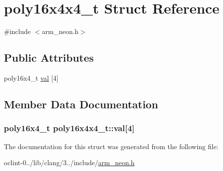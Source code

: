 \hypertarget{structpoly16x4x4__t}{\section{poly16x4x4\-\_\-t Struct Reference}
\label{structpoly16x4x4__t}
}


{\ttfamily \#include $<$arm\-\_\-neon.\-h$>$}

\subsection*{Public Attributes}
\begin{DoxyCompactItemize}
\item 
poly16x4\-\_\-t \hyperlink{structpoly16x4x4__t_a7380b4f99a00dc7754d121da527832ad}{val} \mbox{[}4\mbox{]}
\end{DoxyCompactItemize}


\subsection{Member Data Documentation}
\hypertarget{structpoly16x4x4__t_a7380b4f99a00dc7754d121da527832ad}{
\subsubsection[{val}]{\setlength{\rightskip}{0pt plus 5cm}poly16x4\-\_\-t poly16x4x4\-\_\-t\-::val\mbox{[}4\mbox{]}}}\label{structpoly16x4x4__t_a7380b4f99a00dc7754d121da527832ad}


The documentation for this struct was generated from the following file\-:\begin{DoxyCompactItemize}
\item 
oclint-\/0../lib/clang/3../include/\hyperlink{arm__neon_8h}{arm\-\_\-neon.\-h}\end{DoxyCompactItemize}
